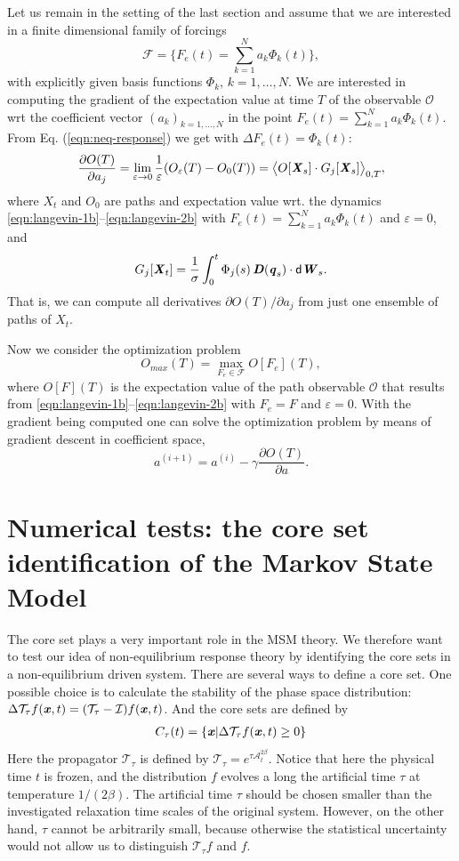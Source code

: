\documentclass[aip,jcp,a4paper,reprint,onecolumn]{revtex4-1}
\newcommand{\vect}[1]{\textbf{\textit{#1}}}
\newcommand{\dd}{\textsf{d}}
\newcommand{\eps}{\varepsilon}
\newcommand{\mt}{\mathcal T}
\newcommand{\mi}{\mathcal I}
\newcommand{\fwg}{{\mathcal A}}
\begin{document}
Let us remain in the setting of the last section and assume that we are interested in a finite dimensional family of forcings
\[
\mathcal{F}=\{F_e(t)=\sum_{k=1}^N a_k \Phi_k(t)\},
\]
with explicitly given basis functions $\Phi_k$, $k=1,\ldots,N$.
We are interested in computing the gradient of the expectation value at time $T$ of the observable $\mathcal{O}$ wrt the coefficient vector $(a_k)_{k=1,\ldots,N}$ in the point $F_e(t)=\sum_{k=1}^N a_k \Phi_k(t)$. From Eq. (\ref{eqn:neq-response}) we get with $\Delta F_e(t)=\Phi_k(t)$:
\[
\frac{\partial O(T)}{\partial a_j} = \lim_{\eps\to 0}\frac{1}{\eps}( O_\eps(T) -
  O_0(T))=\big\langle O[\vect X_s]\cdot G_j[\vect X_s]\big\rangle_{0,T},
\]
where $X_t$ and $O_0$ are paths and expectation value wrt. the dynamics \eqref{eqn:langevin-1b}--\eqref{eqn:langevin-2b} with $F_e(t)=\sum_{k=1}^N a_k \Phi_k(t)$ and $\eps=0$, and
\[
G_j[\vect X_t]
  = \frac{1}\sigma\int_0^t
  \Phi_j(s)\,\vect D(\vect q_s)\cdot\dd\vect W_s. 
\]
That is, we can compute all derivatives $\partial O(T)/\partial a_j$ from just one ensemble of paths of $X_t$. 

Now we consider the optimization problem
\[
O_{max}(T) = \max_{F_e\in \mathcal{F}} O[F_e](T),
\]
where $O[F](T)$ is the expectation value of the path observable $\mathcal{O}$ that results from \eqref{eqn:langevin-1b}--\eqref{eqn:langevin-2b} with $F_e=F$ and $\eps=0$.
With the gradient being computed one can solve the optimization problem by means of gradient descent in coefficient space,
\[
a^{(i+1)}=a^{(i)} -\gamma \frac{\partial O(T)}{\partial a}.
\]


\section{Numerical tests: the core set identification of  the Markov State Model }

The core set plays a very important role in the MSM theory.  We
therefore want to test our idea of non-equilibrium response theory by
identifying the core sets in a non-equilibrium driven system.
There are several ways to define a core set.
One possible choice  is to calculate the stability of the phase space
distribution: $\Delta \mt_\tau f(\vect x, t) = (\mt_\tau -\mi) f(\vect
x, t)$. And the core sets are defined by
\begin{align}
  C_\tau(t) = \{\vect x\vert \Delta \mt_\tau f(\vect x, t) \geq 0\}
\end{align}
Here the propagator $\mt_\tau$ is defined by $\mt_\tau =
e^{\tau\fwg_t^{2\beta}}$.  Notice that here the physical time $t$ is
frozen, and the distribution $f$ evolves a long the artificial time
$\tau$ at temperature $1/(2\beta)$. The artificial time $\tau$ should
be chosen smaller than the investigated relaxation time scales of the
original system. However, on the other hand, $\tau$ cannot be
arbitrarily small, because otherwise the statistical uncertainty would
not allow us to distinguish $\mt_\tau f$ and $f$.
\end{document}
